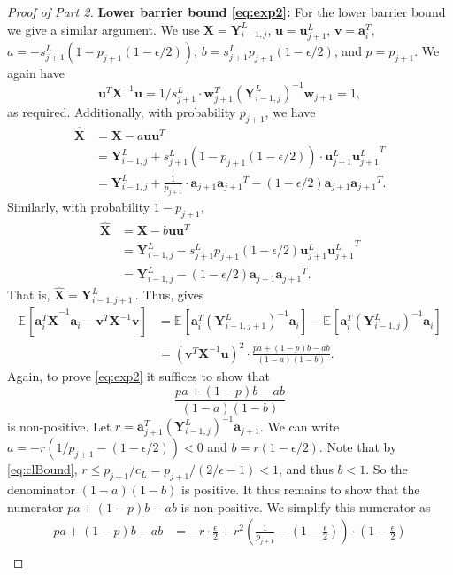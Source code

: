\documentclass{toc}
\newcommand{\bv}[1]{\mathbf{#1}}
\newcommand{\expct}[3]{\mathbb{E}_{{#1}_{#2}}\left[#3\right]}
\begin{document}
\begin{proof}[Proof of  Part 2]
\noindent \textbf{Lower barrier bound \eqref{eq:exp2}:}
For the lower barrier bound we give a similar argument. We use $\bv{X} = \bv{Y}^L_{i-1,j}$, $\bv{u} = \bv{u}^L_{j+1}$, $\bv{v} = \bv{a}_i^T$, $a = -s^L_{j+1} (1 - p_{j+1} (1 - \epsilon / 2))$, $b = s^L_{j+1} p_{j+1} (1 - \epsilon / 2)$, and $p = p_{j+1}$. We again have
%
\[
  \bv{u}^T \bv{X}^{-1} \bv{u} = 1/s^L_{j+1} \cdot \bv{w}_{j+1}^T (\bv{Y}^L_{i-1,j})^{-1}  \bv{w}_{j+1} = 1,
\]
as required. Additionally, with probability 
%
$p_{j+1}$, we have   %
\begin{align*}
\bv{\widehat X} &= \bv{X} - a \bv{uu}^T\\ 
&=  \bv{Y}^L_{i-1,j} + s^L_{j+1} (1 - p_{j+1} (1 - \epsilon / 2)) \cdot \bv{u}_{j+1}^L {\bv{u}_{j+1}^L }^T\\
&=  \bv{Y}^L_{i-1,j} + \frac{1}{p_{j+1}} \cdot \bv{a}_{j+1} {\bv{a}_{j+1}}^T - (1 - \epsilon / 2) \bv{a}_{j+1} {\bv{a}_{j+1}}^T.
\end{align*}
Similarly, with probability $1-p_{j+1}$,
\begin{align*}
\bv{\widehat X} &= \bv{X} - b \bv{uu}^T\\ 
&=   \bv{Y}^L_{i-1,j}  - s^L_{j+1} p_{j+1} (1 - \epsilon / 2) \bv{u}_{j+1}^L {\bv{u}_{j+1}^L }^T\\
& = \bv{Y}^L_{i-1,j} - (1 - \epsilon / 2) \bv{a}_{j+1} {\bv{a}_{j+1}}^T.
\end{align*}
That is, $\bv{\widehat X} = \bv{Y}^L_{i-1,j+1}$\,.  Thus,  gives
\begin{align*}
\expct{}{}{\bv{a}_i^T \bv{\widehat X}^{-1} \bv{a}_i - \bv{v}^T \bv{X}^{-1} \bv{v}}  &= \expct{}{}{\bv{a}_i^T (\bv{Y}^L_{i-1,j+1})^{-1} \bv{a}_i} - \expct{}{}{\bv{a}_i^T (\bv{Y}^L_{i-1,j})^{-1}  \bv{a}_i}\\
&= (\bv{v}^T \bv{X}^{-1} \bv{u})^2 \cdot \frac{pa + (1-p)b - ab}{(1-a)(1-b)}.
\end{align*}
Again, to prove \eqref{eq:exp2} it suffices to show that
%
\[
  \frac{pa + (1-p)b - ab}{(1-a)(1-b)}
\]
is non-positive. Let
$r = \bv{a}_{j+1}^T (\bv{Y}^L_{i-1,j})^{-1} \bv{a}_{j+1}$. We can
write
$a = -r \left (1/p_{j+1} - \left (1-\epsilon/2 \right) \right ) < 0$
and $b = r \left (1-\epsilon/2\right)$. Note that by
\eqref{eq:clBound},
$r \le p_{j+1}/{c_L} = p_{j+1}/(2/\epsilon-1) < 1$, and thus $b <
1$. So the denominator $(1-a)(1-b)$ is positive. It thus remains to
show that the numerator $pa + (1-p)b - ab$ is non-positive. We
simplify this numerator as
 \begin{align*}
 pa + (1-p)b - ab &= -r \cdot \frac{\epsilon}{2} + r^2 \left (\frac{1}{p_{j+1}} - \left (1-\frac{\epsilon}{2}\right ) \right ) \cdot \left (1-\frac{\epsilon}{2}\right)\\

\end{align*}
\end{proof}
\end{document}

